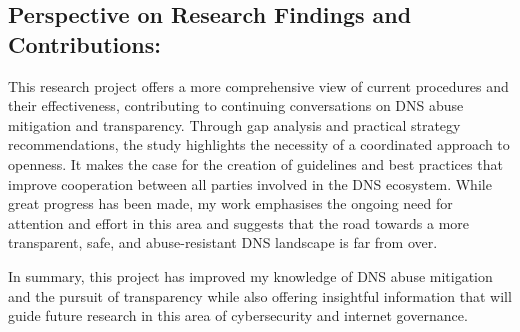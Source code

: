 \subsection{Perspective on Research Findings and Contributions: }

This research project offers a more comprehensive view of current procedures and their effectiveness, contributing to continuing conversations on DNS abuse mitigation and transparency. Through gap analysis and practical strategy recommendations, the study highlights the necessity of a coordinated approach to openness. It makes the case for the creation of guidelines and best practices that improve cooperation between all parties involved in the DNS ecosystem. While great progress has been made, my work emphasises the ongoing need for attention and effort in this area and suggests that the road towards a more transparent, safe, and abuse-resistant DNS landscape is far from over.


In summary, this project has improved my knowledge of DNS abuse mitigation and the pursuit of transparency while also offering insightful information that will guide future research in this  area of cybersecurity and internet governance.


